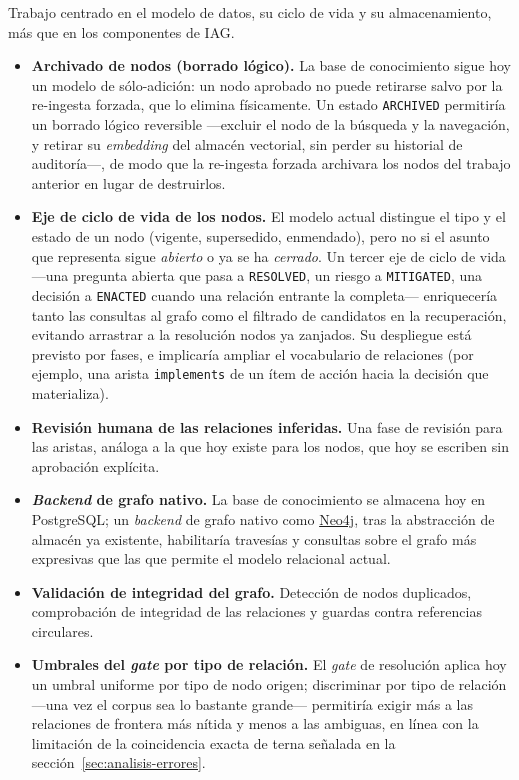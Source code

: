 Trabajo centrado en el modelo de datos, su ciclo de vida y su almacenamiento, más que en los
componentes de \ac{IAG}.

\begin{itemize}
  \item \textbf{Archivado de nodos (borrado lógico).} La base de conocimiento sigue hoy un modelo
        de sólo-adición: un nodo aprobado no puede retirarse salvo por la re-ingesta forzada, que lo
        elimina físicamente. Un estado \texttt{ARCHIVED} permitiría un borrado lógico reversible
        —excluir el nodo de la búsqueda y la navegación, y retirar su \textit{embedding} del almacén
        vectorial, sin perder su historial de auditoría—, de modo que la re-ingesta forzada
        archivara los nodos del trabajo anterior en lugar de destruirlos.

  \item \textbf{Eje de ciclo de vida de los nodos.} El modelo actual distingue el tipo y el estado
        de un nodo (vigente, supersedido, enmendado), pero no si el asunto que representa sigue
        \emph{abierto} o ya se ha \emph{cerrado}. Un tercer eje de ciclo de vida —una pregunta
        abierta que pasa a \texttt{RESOLVED}, un riesgo a \texttt{MITIGATED}, una decisión a
        \texttt{ENACTED} cuando una relación entrante la completa— enriquecería tanto las consultas
        al grafo como el filtrado de candidatos en la recuperación, evitando arrastrar a la
        resolución nodos ya zanjados. Su despliegue está previsto por fases, e implicaría ampliar el
        vocabulario de relaciones (por ejemplo, una arista \texttt{implements} de un ítem de acción
        hacia la decisión que materializa).

  \item \textbf{Revisión humana de las relaciones inferidas.} Una fase de revisión para las aristas,
        análoga a la que hoy existe para los nodos, que hoy se escriben sin aprobación explícita.

  \item \textbf{\textit{Backend} de grafo nativo.} La base de conocimiento se almacena hoy en
        PostgreSQL; un \textit{backend} de grafo nativo como \href{https://neo4j.com}{Neo4j}, tras
        la abstracción de almacén ya existente, habilitaría travesías y consultas sobre el grafo más
        expresivas que las que permite el modelo relacional actual.

  \item \textbf{Validación de integridad del grafo.} Detección de nodos duplicados, comprobación de
        integridad de las relaciones y guardas contra referencias circulares.

  \item \textbf{Umbrales del \textit{gate} por tipo de relación.} El \textit{gate} de resolución
        aplica hoy un umbral uniforme por tipo de nodo origen; discriminar por tipo de relación
        —una vez el corpus sea lo bastante grande— permitiría exigir más a las relaciones de
        frontera más nítida y menos a las ambiguas, en línea con la limitación de la coincidencia
        exacta de terna señalada en la sección~\ref{sec:analisis-errores}.
\end{itemize}

